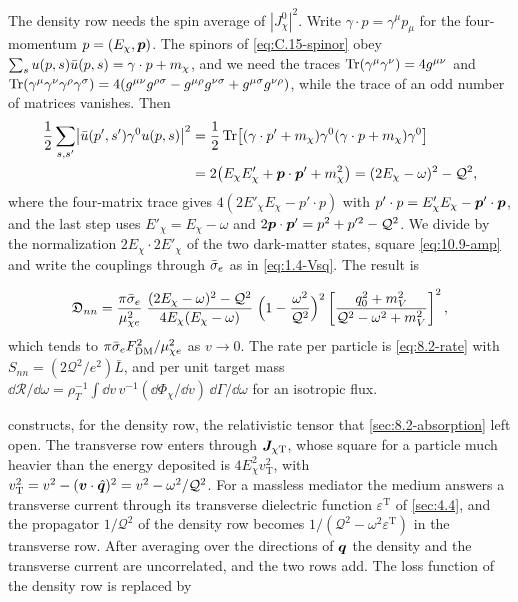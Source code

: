 The density row needs the spin average of $|J^0_\chi|^2$. Write $\gamma\cdot p = \gamma^\mu p_\mu$ for the four-momentum $p = (E_\chi, \bm{p})$. The spinors of \cref{eq:C.15-spinor} obey $\sum_su(p,s)\bar u(p,s) = \gamma\cdot p + m_{\chi}$, and we need the traces $\operatorname{Tr}(\gamma^\mu\gamma^\nu) = 4g^{\mu\nu}$ and $\operatorname{Tr}(\gamma^\mu\gamma^\nu\gamma^\rho\gamma^\sigma) = 4(g^{\mu\nu}g^{\rho\sigma} - g^{\mu\rho}g^{\nu\sigma} + g^{\mu\sigma}g^{\nu\rho})$, while the trace of an odd number of matrices vanishes. Then
\begin{equation*}
  \begin{aligned}
  \frac12\sum_{s,s'}\bigl|\bar u(p',s')\gamma^0u(p,s)\bigr|^2 &= \frac12\operatorname{Tr}\bigl[(\gamma\cdot p' + m_{\chi})\gamma^0(\gamma\cdot p + m_{\chi})\gamma^0\bigr] \\
  &= 2\bigl(E_\chi E'_\chi + \bm{p}\cdot\bm{p}' + m_{\chi}^2\bigr) = (2E_\chi - \omega)^2 - \mathcal{Q}^2 ,
  \end{aligned}
\end{equation*}
where the four-matrix trace gives $4(2E'_\chi E_\chi - p'\cdot p)$ with $p'\cdot p = E'_\chi E_\chi - \bm{p}'\cdot\bm{p}$, and the last step uses $E'_\chi = E_\chi - \omega$ and $2\bm{p}\cdot\bm{p}' = p^2 + p'^2 - \mathcal{Q}^2$. We divide by the normalization $2E_\chi\cdot2E'_\chi$ of the two dark-matter states, square \cref{eq:10.9-amp} and write the couplings through $\bar{\sigma}_{e}$ as in \cref{eq:1.4-Vsq}. The result is
\begin{keyresult}
\begin{equation}
  \mathfrak{D}_{nn} = \frac{\pi\bar{\sigma}_{e}}{\mu_{\chi e}^2}\;\frac{(2E_\chi - \omega)^2 - \mathcal{Q}^2}{4E_\chi(E_\chi - \omega)}\;\Bigl(1 - \frac{\omega^2}{\mathcal{Q}^2}\Bigr)^2\left[\frac{q_0^2 + m_V^2}{\mathcal{Q}^2 - \omega^2 + m_V^2}\right]^2 ,
  \label{eq:10.9-Drel}
\end{equation}
which tends to $\pi\bar{\sigma}_{e}F_{\mathrm{DM}}^2/\mu_{\chi e}^2$ as $v \to 0$. The rate per particle is \cref{eq:8.2-rate} with $S_{nn} = (2\mathcal{Q}^2/e^2)\bar L$, and per unit target mass $\dd\mathcal{R}/\dd\omega = \rho_T^{-1}\int\dd v\,v^{-1}(\dd\Phi_\chi/\dd v)\,\dd\varGamma/\dd\omega$ for an isotropic flux.
\end{keyresult}
\noindent {} constructs, for the density row, the relativistic tensor that \cref{sec:8.2-absorption} left open. The transverse row enters through $\bm{J}_{\chi\mathrm{T}}$, whose square for a particle much heavier than the energy deposited is $4E_\chi^2v_{\mathrm{T}}^2$, with $v_{\mathrm{T}}^2 = v^2 - (\bm{v}\cdot\hat{\bm{q}})^2 = v^2 - \omega^2/\mathcal{Q}^2$. For a massless mediator the medium answers a transverse current through its transverse dielectric function $\varepsilon^{\mathrm{T}}$ of \cref{sec:4.4}, and the propagator $1/\mathcal{Q}^2$ of the density row becomes $1/(\mathcal{Q}^2 - \omega^2\varepsilon^{\mathrm{T}})$ in the transverse row. After averaging over the directions of $\bm{q}$ the density and the transverse current are uncorrelated, and the two rows add. The loss function of the density row is replaced by
